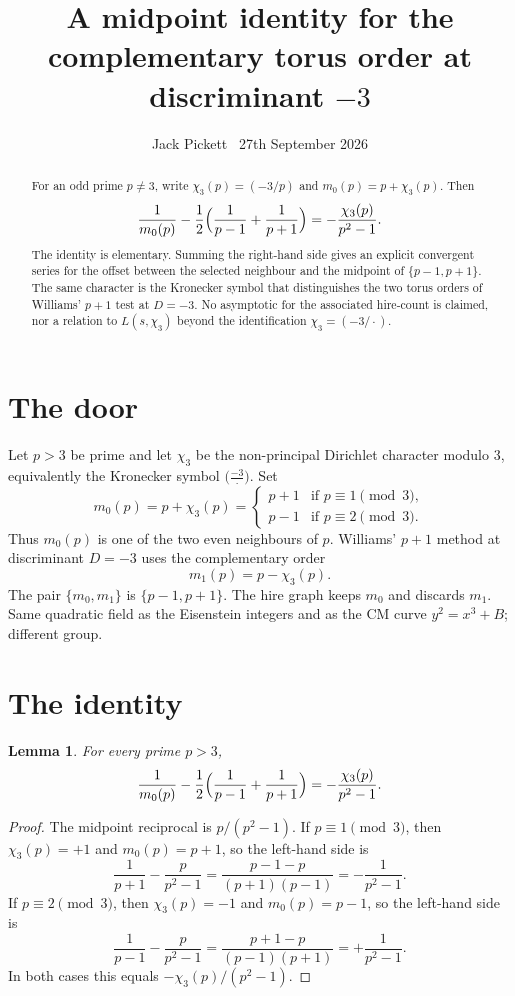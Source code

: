 \documentclass[11pt,a4paper]{article}
\title{A midpoint identity for the complementary torus order at discriminant \(-3\)}
\author{Jack Pickett \textperiodcentered\ 27th September 2026}
\date{}
\newtheorem{lemma}{Lemma}
\begin{document}
\maketitle
\thispagestyle{empty}

\begin{abstract}
For an odd prime \(p\neq 3\), write \(\chi_3(p)=(-3/p)\) and \(m_0(p)=p+\chi_3(p)\). Then
\[
\frac1{m_0(p)}-\frac12\Bigl(\frac1{p-1}+\frac1{p+1}\Bigr)=-\frac{\chi_3(p)}{p^2-1}.
\]
The identity is elementary. Summing the right-hand side gives an explicit convergent series for the offset between the selected neighbour and the midpoint of \(\{p-1,p+1\}\). The same character is the Kronecker symbol that distinguishes the two torus orders of Williams' \(p+1\) test at \(D=-3\). No asymptotic for the associated hire-count is claimed, nor a relation to \(L(s,\chi_3)\) beyond the identification \(\chi_3=(-3/\cdot)\).
\end{abstract}

\section{The door}

Let \(p>3\) be prime and let \(\chi_3\) be the non-principal Dirichlet character modulo \(3\), equivalently the Kronecker symbol \(\bigl(\frac{-3}{\cdot}\bigr)\). Set
\[
m_0(p)=p+\chi_3(p)=
\begin{cases}
p+1 & \text{if }p\equiv 1\pmod{3},\\
p-1 & \text{if }p\equiv 2\pmod{3}.
\end{cases}
\]
Thus \(m_0(p)\) is one of the two even neighbours of \(p\). Williams' \(p+1\) method at discriminant \(D=-3\) uses the complementary order
\[
m_1(p)=p-\chi_3(p).
\]
The pair \(\{m_0,m_1\}\) is \(\{p-1,p+1\}\). The hire graph keeps \(m_0\) and discards \(m_1\). Same quadratic field as the Eisenstein integers and as the CM curve \(y^2=x^3+B\); different group.

\section{The identity}

\begin{lemma}
\label{lem:midgap}
For every prime \(p>3\),
\[
\frac1{m_0(p)}-\frac12\Bigl(\frac1{p-1}+\frac1{p+1}\Bigr)=-\frac{\chi_3(p)}{p^2-1}.
\]
\end{lemma}

\begin{proof}
The midpoint reciprocal is \(p/(p^2-1)\). If \(p\equiv 1\pmod{3}\), then \(\chi_3(p)=+1\) and \(m_0(p)=p+1\), so the left-hand side is
\[
\frac1{p+1}-\frac{p}{p^2-1}=\frac{p-1-p}{(p+1)(p-1)}=-\frac1{p^2-1}.
\]
If \(p\equiv 2\pmod{3}\), then \(\chi_3(p)=-1\) and \(m_0(p)=p-1\), so the left-hand side is
\[
\frac1{p-1}-\frac{p}{p^2-1}=\frac{p+1-p}{(p-1)(p+1)}=+\frac1{p^2-1}.
\]
In both cases this equals \(-\chi_3(p)/(p^2-1)\).
\end{proof}
\end{document}
